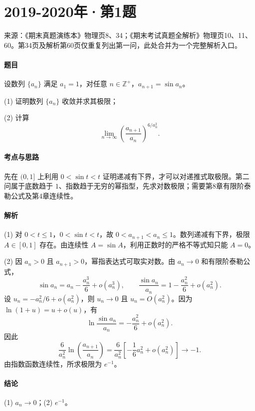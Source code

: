 \documentclass[UTF8,fontset=fandol,12pt,oneside,openany]{ctexrep}
\theoremstyle{definition}
\begin{document}
\par\addvspace{18pt}\noindent\begin{minipage}{\linewidth}
\section{2019-2020年·第1题}
\label{exam:02:2019-2020-1}
\noindent 来源：《期末真题演练本》物理页8、34；《期末考试真题全解析》物理页10、11、60。第34页及解析第60页仅重复列出第一问，此处合并为一个完整解析入口。

\paragraph{题目}
设数列 $\{a_n\}$ 满足 $a_1=1$，对任意 $n\in\mathbb Z^+$，$a_{n+1}=\sin a_n$。

(1) 证明数列 $\{a_n\}$ 收敛并求其极限；

(2) 计算 \[
\lim_{n\to\infty}\left(\frac{a_{n+1}}{a_n}\right)^{6/a_n^2}.
\]
\end{minipage}\par
\paragraph{考点与思路}
先在 $(0,1]$ 上利用 $0<\sin t<t$ 证明递减有下界，才可以对递推式取极限。第二问属于底数趋于 $1$、指数趋于无穷的幂指型，先求对数极限；需要第8章有限阶泰勒公式及第4章连续性。

\paragraph{解析}
(1) 对 $0<t\le1$，$0<\sin t<t$，故 $0<a_{n+1}<a_n\le1$。数列递减有下界，极限 $A\in[0,1]$ 存在。由连续性 $A=\sin A$，利用正数时的严格不等式知只能 $A=0$。

(2) 因 $a_n>0$ 且 $a_{n+1}>0$，幂指表达式可取实对数。由 $a_n\to0$ 和有限阶泰勒公式，
\[
\sin a_n=a_n-\frac{a_n^3}{6}+o(a_n^3),\qquad
\frac{\sin a_n}{a_n}=1-\frac{a_n^2}{6}+o(a_n^2).
\]
设 $u_n=-a_n^2/6+o(a_n^2)$，则 $u_n\to0$ 且 $u_n=O(a_n^2)$。因为 $\ln(1+u)=u+o(u)$，有
\[
\ln\frac{\sin a_n}{a_n}=-\frac{a_n^2}{6}+o(a_n^2).
\]
因此
\[
\frac6{a_n^2}\ln\left(\frac{a_{n+1}}{a_n}\right)=\frac6{a_n^2}\left[-\frac16a_n^2+o(a_n^2)\right]\to-1.
\]由指数函数连续性，所求极限为 $e^{-1}$。

\paragraph{结论}
(1) $a_n\to0$；(2) $e^{-1}$。
\end{document}
